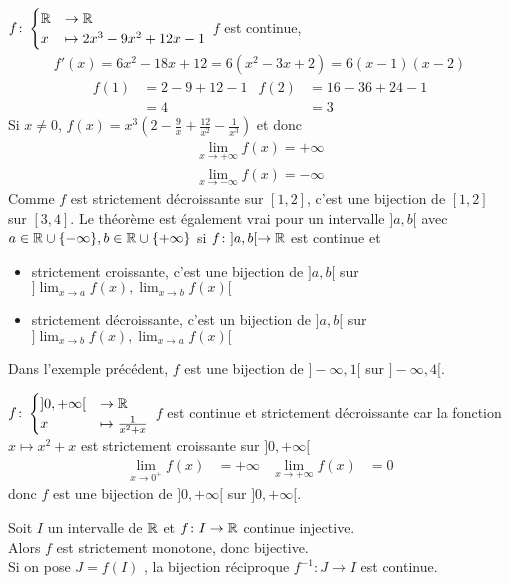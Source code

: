 \begin{exemple}
$
f \colon 
\begin{cases}
\mathbb{R} &\to \mathbb{R} \\
x &\mapsto 2x^3 - 9x^2 + 12x - 1
\end{cases}
$
$f$ est continue, 
\begin{align*}
f'(x) = 6x^2 - 18x + 12 = 6(x^2 - 3x + 2) = 6(x-1)(x-2)
\end{align*}
\begin{align*}
f(1) &= 2 - 9 + 12 - 1 & f(2) &= 16 - 36 + 24 - 1  \\
&= 4 & &=3
\end{align*}
Si $x \neq 0$, $f(x) = x^3 \left( 2 - \frac{9}{x} + \frac{12}{x^2} - \frac{1}{x^3} \right)$ et donc 
\begin{align*}
\lim_{x \to +\infty} f(x) = +\infty \\
\lim_{x \to -\infty} f(x) = -\infty
\end{align*}
Comme $f$ est strictement décroissante sur $[1, 2]$, c'est une bijection de $[1, 2]$ sur $[3, 4]$. Le théorème est également vrai pour un intervalle $]a, b[$ avec $a \in \mathbb{R} \cup \{-\infty\}, b \in \mathbb{R} \cup \{+\infty\}$ si 
$f \colon ]a, b[ \to \mathbb{R}$ est continue et 
\begin{itemize}
\item strictement croissante, c'est une bijection de $]a, b[$ sur $]\lim_{x \to a} f(x), \lim_{x \to b} f(x)[$
\item strictement décroissante, c'est un bijection de $]a, b[$ sur $]\lim_{x \to b} f(x), \lim_{x \to a} f(x)[$
\end{itemize}
Dans l'exemple précédent, $f$ est une bijection de $]-\infty, 1[$ sur $]-\infty, 4[$.
\end{exemple}

\begin{exemple}
$
f \colon
\begin{cases}
]0, +\infty[ &\to \mathbb{R} \\
x &\mapsto \frac{1}{x^2 + x}
\end{cases}
$
$f$ est continue et strictement décroissante car la fonction $x \mapsto x^2 + x$ est strictement croissante sur $]0, +\infty[$
\begin{align*}
\lim_{x \to 0^+} f(x) &= +\infty & \lim_{x \to +\infty} f(x) &= 0
\end{align*}
donc $f$ est une bijection de $]0, +\infty[$ sur $]0, +\infty[$.
\end{exemple}

\begin{graybox}
\begin{theoreme}
Soit $I$ un intervalle de $\mathbb{R}$ et $f \colon I \to \mathbb{R}$ continue injective.
\\
Alors $f$ est strictement monotone, donc bijective.
\\
Si on pose $J = f(I)$ , la bijection réciproque $f^{-1} \colon J \to I$ est continue.
\end{theoreme}
\end{graybox}

